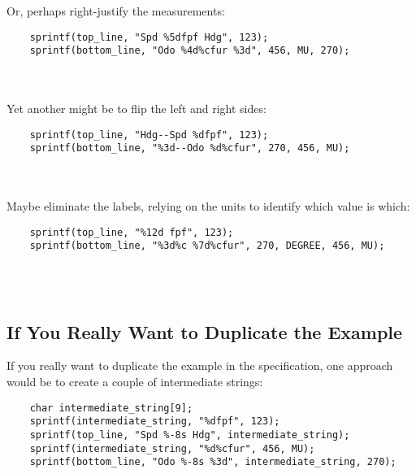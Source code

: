 Or, perhaps right-justify the measurements:
\begin{lstlisting}
    sprintf(top_line, "Spd %5dfpf Hdg", 123);
    sprintf(bottom_line, "Odo %4d%cfur %3d", 456, MU, 270);
\end{lstlisting} \phantom{x}\\
 \\

Yet another might be to flip the left and right sides:
\begin{lstlisting}
    sprintf(top_line, "Hdg--Spd %dfpf", 123);
    sprintf(bottom_line, "%3d--Odo %d%cfur", 270, 456, MU);
\end{lstlisting} \phantom{x}\\
 \\

Maybe eliminate the labels, relying on the units to identify which value is which:
\begin{lstlisting}
    sprintf(top_line, "%12d fpf", 123);
    sprintf(bottom_line, "%3d%c %7d%cfur", 270, DEGREE, 456, MU);
\end{lstlisting} \phantom{x}\\
 \\

\subsection{If You Really Want to Duplicate the Example}

If you really want to duplicate the example in the specification, one approach would be to create a couple of intermediate strings:
\begin{lstlisting}
    char intermediate_string[9];
    sprintf(intermediate_string, "%dfpf", 123);
    sprintf(top_line, "Spd %-8s Hdg", intermediate_string);
    sprintf(intermediate_string, "%d%cfur", 456, MU);
    sprintf(bottom_line, "Odo %-8s %3d", intermediate_string, 270);
\end{lstlisting} \phantom{x}\\
\\

